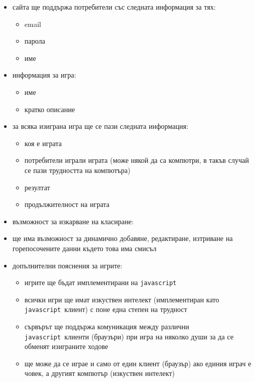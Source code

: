\documentclass[a4paper]{article}
\def\js{\texttt{javascript}}
\begin{document}
  \begin{itemize}
    \item сайта ще поддържа потребители със следната информация за тях:
    \begin{itemize}
      \item email
      \item парола
      \item име
    \end{itemize}

    \item информация за игра:
    \begin{itemize}
      \item име
      \item кратко описание
    \end{itemize} 
    
    \item за всяка изиграна игра ще се пази следната информация:
    \begin{itemize}
      \item коя е играта
      \item потребители играли играта (може някой да са компютри, в такъв случай се пази трудността на компютъра)
      \item резултат
      \item продължителност на играта
    \end{itemize} 

    \item възможност за изкарване на класиране:

    \item ще има възможност за динамично добавяне, редактиране, изтриване на горепосочените данни където това има смисъл 

    \item допълнителни пояснения за игрите:
    \begin{itemize}
      \item игрите ще бъдат имплементирани на \js
      \item всички игри ще имат изкуствен интелект (имплементиран като \js\ клиент) с поне една степен на трудност
      \item сървърът ще поддържа комуникация между различни \js\ клиенти (браузъри) при игра на няколко души за да се обменят изиграните ходове
      \item ще може да се играе и само от един клиент (браузър) ако единия играч е човек, а другият компютър (изкуствен интелект)
    \end{itemize} 
  \end{itemize}
\end{document}
